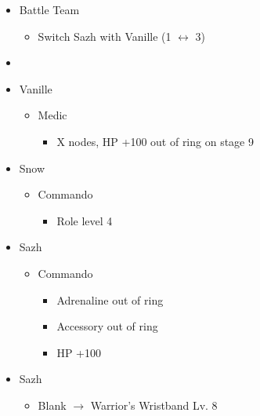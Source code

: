 \begin{multicols}{2}
\begin{menu}
\begin{itemize}
    \paradigm
    \begin{itemize}
        \item Battle Team
        \begin{itemize}
            \item Switch Sazh with Vanille (1 $\leftrightarrow$ 3)
        \end{itemize}
        \item {}%
{\paradigmline{(\med)}{\com}{(\com)}}%
{\paradigmline{(\sab)}{\com}{\com}}%
{\paradigmline{(\sab)}{\sen}{(\syn)}}%
{\paradigmline{(\rav)}{(\rav)}{(\syn)}}%
{\paradigmline[5]{\textit{(\sab)}}{\textit{(\rav)}}{\textit{\rav}}}%
{\paradigmline{\rav}{\rav}{\rav}}
    \end{itemize}
    \crystarium
    \begin{itemize}
        \item Vanille
        \begin{itemize}
            \item Medic
            \begin{itemize}
            	\item X nodes, HP +100 out of ring on stage 9
            \end{itemize}
        \end{itemize}
        \item Snow
        \begin{itemize}
            \item Commando
            \begin{itemize}
                \item Role level 4
            \end{itemize}
        \end{itemize}
        \item Sazh
        \begin{itemize}
            \item Commando
            \begin{itemize}
                \item Adrenaline out of ring
                \item Accessory out of ring
                \item HP +100
            \end{itemize}
        \end{itemize}
    \end{itemize}
    \equip
    \begin{itemize}
        \item Sazh
        \begin{itemize}
            \item Blank $\rightarrow$ Warrior's Wristband Lv. 8
        \end{itemize}
    \end{itemize}
\end{itemize}
\end{menu}


\end{multicols}
